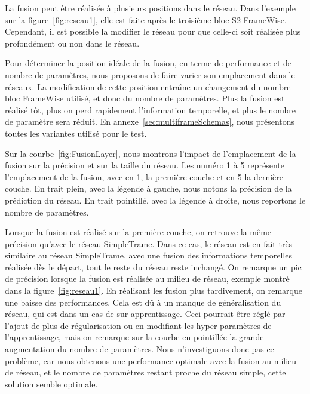 La fusion peut être réalisée à plusieurs positions dans le réseau.
Dans l'exemple sur la figure~\ref{fig:reseau1}, elle est faite après le troisième bloc S2-FrameWise.
Cependant, il est possible la modifier le réseau pour que celle-ci soit réalisée plus profondément ou non dans le réseau.

Pour déterminer la position idéale de la fusion, en terme de performance et de nombre de paramètres, nous proposons de faire varier son emplacement dans le réseaux.
La modification de cette position entraîne un changement du nombre bloc FrameWise utilisé, et donc du nombre de paramètres.
Plus la fusion est réalisé tôt, plus on perd rapidement l’information temporelle, et plus le nombre de paramètre sera réduit.
En annexe~\ref{sec:multiframeSchemas}, nous présentons toutes les variantes utilisé pour le test.

Sur la courbe~\ref{fig:FusionLayer}, nous montrons l'impact de l'emplacement de la fusion sur la précision et sur la taille du réseau.
Les numéro 1 à 5 représente l’emplacement de la fusion, avec en 1, la première couche et en 5 la dernière couche.
En trait plein, avec la légende à gauche, nous notons la précision de la prédiction du réseau.
En trait pointillé, avec la légende à droite, nous reportons le nombre de paramètres.

Lorsque la fusion est réalisé sur la première couche, on retrouve la même précision qu'avec le réseau SimpleTrame. 
Dans ce cas, le réseau est en fait très similaire au réseau SimpleTrame, avec une fusion des informations temporelles réalisée dès le départ, tout le reste du réseau reste inchangé.
On remarque un pic de précision lorsque la fusion est réalisée au milieu de réseau, exemple montré dans la figure~\ref{fig:reseau1}.
En réalisant les fusion plus tardivement, on remarque une baisse des performances.
Cela est dû à un manque de généralisation du réseau, qui est dans un cas de sur-apprentissage.
Ceci pourrait être réglé par l'ajout de plus de régularisation ou en modifiant les hyper-paramètres de l'apprentissage, mais on remarque sur la courbe en pointillée la grande augmentation du nombre de paramètres.
Nous n’investiguons donc pas ce problème, car nous obtenons une performance optimale avec la fusion au milieu de réseau, et le nombre de paramètres restant proche du réseau simple, cette solution semble optimale.


